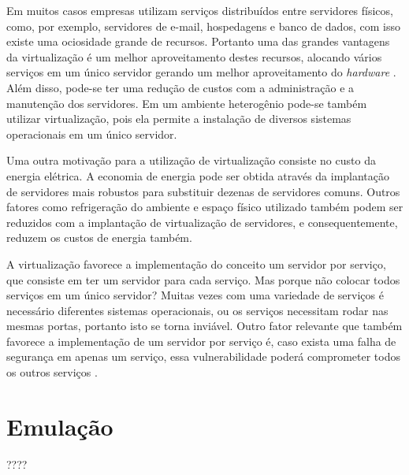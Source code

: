 Em muitos casos empresas utilizam serviços distribuídos entre servidores físicos, como, por exemplo, servidores de e-mail, hospedagens e 
banco de dados, com isso existe uma ociosidade grande de recursos. Portanto uma das grandes vantagens da virtualização é um melhor 
aproveitamento destes recursos, alocando vários serviços em um único servidor gerando um melhor aproveitamento do \textit{hardware} 
\cite{moreira2006}. Além disso, pode-se ter uma redução de custos com a administração e a manutenção dos servidores. Em um ambiente 
heterogênio pode-se também utilizar virtualização, pois ela permite a instalação de diversos sistemas operacionais em um único servidor.

Uma outra motivação para a utilização de virtualização consiste no custo da energia elétrica. A economia de energia pode ser obtida através 
da implantação de servidores mais robustos para substituir dezenas de servidores comuns. Outros fatores como refrigeração do ambiente e 
espaço físico utilizado também podem ser reduzidos com a implantação de virtualização de servidores, e consequentemente, reduzem os 
custos de energia também.

A virtualização favorece a implementação do conceito um servidor por serviço, que consiste em ter um servidor para cada serviço.
Mas porque não colocar todos serviços em um único servidor? Muitas vezes com uma variedade de serviços é necessário diferentes 
sistemas operacionais, ou os serviços necessitam rodar nas mesmas portas, portanto isto se torna inviável. Outro fator relevante que 
também favorece a implementação de um servidor por serviço é, caso exista uma falha de segurança em apenas um serviço, essa 
vulnerabilidade poderá comprometer todos os outros serviços \cite{carissimi2008}.




\section{Emulação}
????


